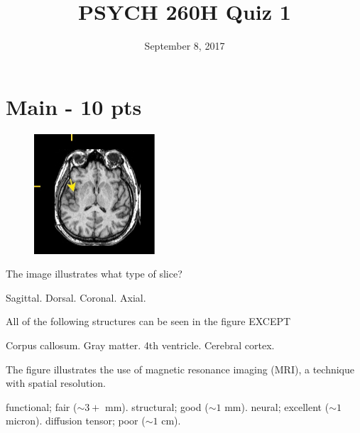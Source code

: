 \documentclass[answers]{exam}
\title{PSYCH 260H Quiz 1}
\author{}
\date{September 8, 2017}
\begin{document}
\maketitle

\begin{center}
\end{center}
\vspace{0.1in}

\newpage

\section{Main - 10 pts}

\begin{questions}


\begin{figure}[h]
\includegraphics[width=0.4\textwidth]{img/260-2016-09-12-quiz-1-fig-1.jpg}
\centering
\end{figure}

\question The image illustrates what type of slice?
\begin{choices}
\choice Sagittal.
\choice Dorsal.
\choice Coronal.
\correctchoice Axial.
\end{choices}

\question All of the following structures can be seen in the figure EXCEPT
\begin{choices}
\choice Corpus callosum.
\choice Gray matter.
\correctchoice 4th ventricle.
\choice Cerebral cortex.
\end{choices}

\question The figure illustrates the use of \fillin magnetic resonance imaging (MRI), a technique with \fillin spatial resolution.
\begin{choices}
\choice functional; fair ($\sim 3+$ mm).
\correctchoice structural; good ($\sim 1$ mm).
\choice neural; excellent ($\sim 1$ micron).
\choice diffusion tensor; poor ($\sim 1$ cm).
\end{choices}


\end{questions}
\end{document}
